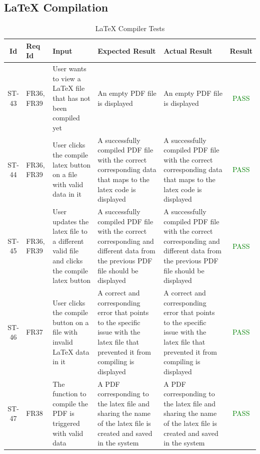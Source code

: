 \documentclass[12pt, titlepage]{article}
\begin{document}
	\subsection{LaTeX Compilation}
	
	\begin{center}
		\begin{longtable}{|c|p{1cm}|p{2.7cm}|p{3cm}|p{3cm}|c|}
			\caption{LaTeX Compiler Tests \label{long}}\\
			\hline
			\textbf{Id} & \textbf{Req Id} & \textbf{Input} & \textbf{Expected Result} & \textbf{Actual Result} & \textbf{Result}   \\
			\hline
			ST-43 & FR36, FR39 & User wants to view a LaTeX file that has not been compiled yet & An empty PDF file is displayed & An empty PDF file is displayed &  \textcolor{green}{PASS} \\
			\hline
			ST-44 & FR36, FR39 & User clicks the compile latex button on a file with valid data in it & A successfully compiled PDF file with the correct corresponding data that maps to the latex code is displayed & A successfully compiled PDF file with the correct corresponding data that maps to the latex code is displayed &  \textcolor{green}{PASS} \\
			\hline
			ST-45 & FR36, FR39 & User updates the latex file to a different valid file and clicks the compile latex button &  A successfully compiled PDF file with the correct corresponding and different data from the previous PDF file should be displayed &  A successfully compiled PDF file with the correct corresponding and different data from the previous PDF file should be displayed & \textcolor{green}{PASS} \\
			\hline
			ST-46 & FR37 &  User clicks the compile button on a file with invalid LaTeX data in it & A correct and corresponding error that points to the specific issue with the latex file that prevented it from compiling is displayed & A correct and corresponding error that points to the specific issue with the latex file that prevented it from compiling is displayed & \textcolor{green}{PASS} \\
			\hline
			ST-47 & FR38 & The function to compile the PDF is triggered with valid data & A PDF corresponding to the latex file and sharing the name of the latex file is created and saved in the system & A PDF corresponding to the latex file and sharing the name of the latex file is created and saved in the system & \textcolor{green}{PASS}\\
			\hline
		\end{longtable}
	\end{center}
	
\end{document}
